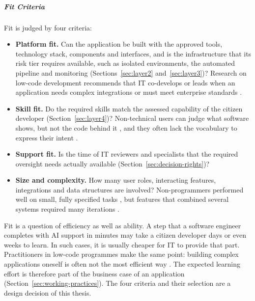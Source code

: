 \documentclass[10pt,a4paper]{article}
\begin{document}
\subparagraph{Fit Criteria}

Fit is judged by four criteria:
\begin{itemize}
    \item \textbf{Platform fit.} Can the application be built with the
    approved tools, technology stack, components and interfaces, and is
    the infrastructure that its risk tier requires available, such as
    isolated environments, the automated pipeline and monitoring
    (Sections~\ref{sec:layer2} and~\ref{sec:layer3})? Research on
    low-code development recommends that IT co-develops or leads when an
    application needs complex integrations or must meet enterprise
    standards \parencite{viljoen2024}.

    \item \textbf{Skill fit.} Do the required skills match the assessed
    capability of the citizen developer (Section~\ref{sec:layer4})?
    Non-technical users can judge what software shows, but not the code
    behind it \parencite{kobiella2026}, and they often lack the
    vocabulary to express their intent \parencite{feldman2024}.

    \item \textbf{Support fit.} Is the time of IT reviewers and
    specialists that the required oversight needs actually available
    (Section~\ref{sec:decision-rights})?

    \item \textbf{Size and complexity.} How many user roles, interacting
    features, integrations and data structures are involved?
    Non-programmers performed well on small, fully specified tasks
    \parencite{esnaola2026}, but features that combined several systems
    required many iterations \parencite{fortesferreira2025}.
\end{itemize}

Fit is a question of efficiency as well as ability. A step that a
software engineer completes with AI support in minutes may take a
citizen developer days or even weeks to learn. In such cases, it is usually cheaper
for IT to provide that part. Practitioners in low-code programmes make
the same point: building complex applications oneself is often not
the most efficient way \parencite{binzer2024}. The expected learning
effort is therefore part of the business case of an application
(Section~\ref{sec:working-practices}). The four criteria and their
selection are a design decision of this thesis.
\end{document}
